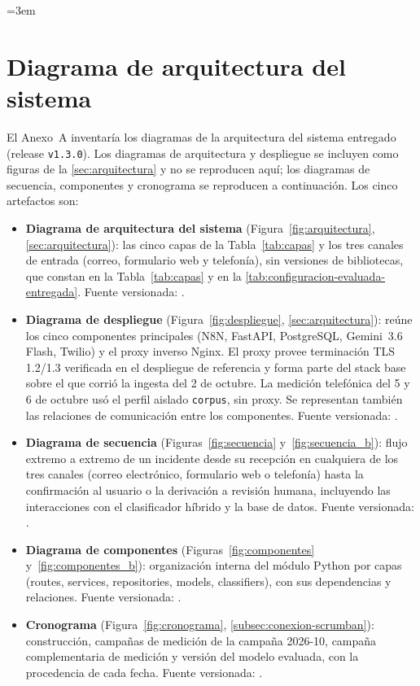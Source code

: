 
\emergencystretch=3em

\section{Diagrama de arquitectura del sistema}\label{sec:anexo-diagrama-arquitectura}

El Anexo~A inventaría los diagramas de la arquitectura del sistema entregado (release \texttt{v1.3.0}). Los diagramas de arquitectura y despliegue se incluyen como figuras de la \autoref{sec:arquitectura} y no se reproducen aquí; los diagramas de secuencia, componentes y cronograma se reproducen a continuación. Los cinco artefactos son:

\begin{itemize}
  \item \textbf{Diagrama de arquitectura del sistema} (Figura~\ref{fig:arquitectura}, \autoref{sec:arquitectura}): las cinco capas de la Tabla~\ref{tab:capas} y los tres canales de entrada (correo, formulario web y telefonía), sin versiones de bibliotecas, que constan en la Tabla~\ref{tab:capas} y en la \autoref{tab:configuracion-evaluada-entregada}. Fuente versionada: .
  \item \textbf{Diagrama de despliegue} (Figura~\ref{fig:despliegue}, \autoref{sec:arquitectura}): reúne los cinco componentes principales (N8N, FastAPI, PostgreSQL, Gemini~3.6 Flash, Twilio) y el proxy inverso Nginx. El proxy provee terminación TLS 1.2/1.3 verificada en el despliegue de referencia y forma parte del stack base sobre el que corrió la ingesta del 2 de octubre. La medición telefónica del 5 y 6 de octubre usó el perfil aislado \texttt{corpus}, sin proxy. Se representan también las relaciones de comunicación entre los componentes. Fuente versionada: .
  \item \textbf{Diagrama de secuencia} (Figuras~\ref{fig:secuencia} y~\ref{fig:secuencia_b}): flujo extremo a extremo de un incidente desde su recepción en cualquiera de los tres canales (correo electrónico, formulario web o telefonía) hasta la confirmación al usuario o la derivación a revisión humana, incluyendo las interacciones con el clasificador híbrido y la base de datos. Fuente versionada: .
  \item \textbf{Diagrama de componentes} (Figuras~\ref{fig:componentes} y~\ref{fig:componentes_b}): organización interna del módulo Python por capas (routes, services, repositories, models, classifiers), con sus dependencias y relaciones. Fuente versionada: .
  \item \textbf{Cronograma} (Figura~\ref{fig:cronograma}, \autoref{subsec:conexion-scrumban}): construcción, campañas de medición de la campaña 2026-10, campaña complementaria de medición y versión del modelo evaluada, con la procedencia de cada fecha. Fuente versionada: .
\end{itemize}

